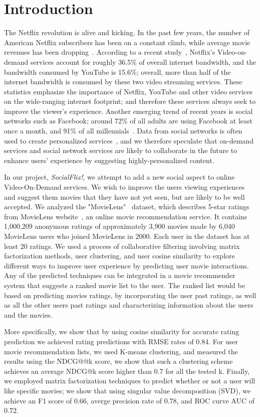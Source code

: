 \section{Introduction}
\label{sec:intro}

The Netflix revolution is alive and kicking. 
In the past few years, the number of American Netflix subscribers has been on a constant climb, while average movie revenues has been dropping~\cite{MisixNetflix}.
According to a recent study~\cite{VarietyNetflixBandwidth}, Netflix's Video-on-demand services account for roughly 36.5\% of overall internet bandwidth, and the bandwidth consumed by YouTube is 15.6\%; overall, more than half of the internet bandwidth is consumed by these two video streaming services.
These statistics emphasize the importance of Netflix, YouTube and other video services on the wide-ranging internet footprint; and therefore these services always seek to improve the viewer's experience.
Another emerging trend of recent years is social networks such as Facebook; around 72\% of all adults are using Facebook at least once a month, and 91\% of all millennials~\cite{FacebookStats}. 
Data from social networks is often used to create personalized services~\cite{carmel2009personalized}, and we therefore speculate that on-demand services and social network services are likely to collaborate in the future to enhance users' experience by suggesting highly-personalized content.

In our project, \textit{SocialFlix!}, we attempt to add a new social aspect to online Video-On-Demand services. 
We wish to improve the users viewing experiences and suggest them movies that they have not yet seen, but are likely to be well accepted.
We analyzed the "MovieLens"~\cite{GroupLens} dataset, which describes 5-star ratings from MovieLens website~\cite{MovieLens}, an online movie recommendation service. It contains 1,000,209 anonymous ratings of approximately 3,900 movies made by 6,040 MovieLens users who joined MovieLens in 2000. Each user in the dataset has at least 20 ratings. 
We used a process of collaborative filtering involving matrix factorization methods, user clustering, and user cosine similarity to explore different ways to improve user experience by predicting user movie interactions. 
Any of the predicted techniques can be integrated in a movie recommender system that suggests a ranked movie list to the user. 
The ranked list would be based on predicting movies ratings, by incorporating the user past ratings, as well as all the other users past ratings and characterizing information about the users and the movies. 

More specifically, we show that by using cosine similarity for accurate rating prediction we achieved rating predictions with RMSE rates of 0.84. 
For user movie recommendation lists, we used K-means clustering, and measured the results using the NDCG@@k score, we show that such a clustering scheme achieves an average NDCG@k score higher than 0.7 for all the tested k.
Finally, we employed matrix factorization techniques to predict whether or not a user will like specific movies; we show that using singular value decomposition (SVD), we achieve an F1 score of 0.66, averge precision rate of 0.78, and ROC curve AUC of 0.72.
